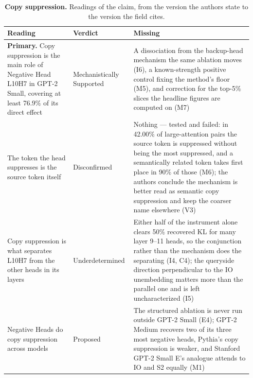 \clearpage
\begin{table}[H]
\centering
\footnotesize
\caption{\textbf{Copy suppression.} Readings of the claim, from the version the authors state to the version the
field cites.}
\label{tab:copy_suppression-readings}
\renewcommand{\arraystretch}{1.18}
\begin{tabular}{@{}>{\raggedright\arraybackslash}p{3.3cm}l>{\raggedright\arraybackslash}p{4.4cm}@{}}
\toprule
\textbf{Reading} & \textbf{Verdict} & \textbf{Missing} \\
\midrule
\textbf{Primary.} Copy suppression is the main role of Negative Head L10H7 in GPT-2 Small, covering at least 76.9\% of its direct effect
  & Mechanistically Supported
  & A dissociation from the backup-head mechanism the same ablation moves (I6), a known-strength positive control fixing the method's floor (M5), and correction for the top-5\% slices the headline figures are computed on (M7) \\
\addlinespace[2pt]
The token the head suppresses is the source token itself
  & Disconfirmed
  & Nothing --- tested and failed: in 42.00\% of large-attention pairs the source token is suppressed without being the most suppressed, and a semantically related token takes first place in 90\% of those (M6); the authors conclude the mechanism is better read as semantic copy suppression and keep the coarser name elsewhere (V3) \\
\addlinespace[2pt]
Copy suppression is what separates L10H7 from the other heads in its layers
  & Underdetermined
  & Either half of the instrument alone clears 50\% recovered KL for many layer 9--11 heads, so the conjunction rather than the mechanism does the separating (I4, C4); the queryside direction perpendicular to the IO unembedding matters more than the parallel one and is left uncharacterized (I5) \\
\addlinespace[2pt]
Negative Heads do copy suppression across models
  & Proposed
  & The structured ablation is never run outside GPT-2 Small (E4); GPT-2 Medium recovers two of its three most negative heads, Pythia's copy suppression is weaker, and Stanford GPT-2 Small E's analogue attends to IO and S2 equally (M1) \\
\bottomrule
\end{tabular}
\end{table}

